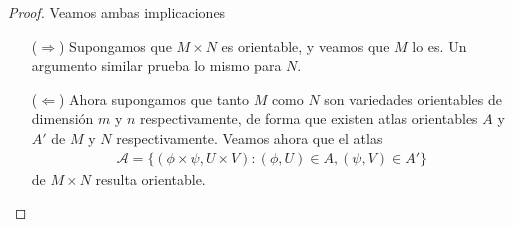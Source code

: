 \documentclass[11pt]{article}
\begin{document}
\begin{proof} Veamos ambas implicaciones
\begin{itemize}[listparindent = \parindent]
\item[($\Rightarrow$)] Supongamos que $M \times N$ es orientable, y veamos que $M$ lo es. Un argumento similar prueba lo mismo para $N$. 

\item[($\Leftarrow$)] Ahora supongamos que tanto $M$ como $N$ son variedades orientables de dimensión $m$ y $n$ respectivamente, de forma que existen atlas orientables $A$ y $A'$ de $M$ y $N$ respectivamente. Veamos ahora que el atlas
\begin{align*}
\mathcal{A} = \{(\phi \times \psi, U \times V) : (\phi,U) \in A, (\psi,V)\in A'\}
\end{align*}
de $M \times N$ resulta orientable.


\end{itemize}
\end{proof}
\end{document}
